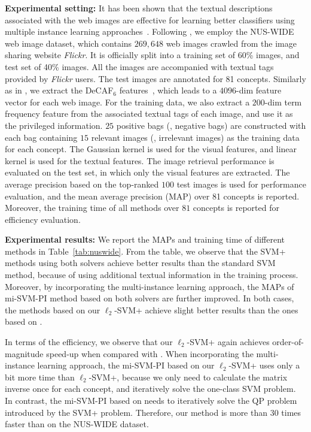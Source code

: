 \noindent\textbf{Experimental setting:} It has been shown that the
textual descriptions associated with the web images are effective for
learning better classifiers using multiple instance learning
approaches~\citep{Li2014ECCV,NiuIJCV2015}.  Following \citep{Li2014ECCV,
  NiuIJCV2015}, we employ the NUS-WIDE web image dataset, which
contains $269, 648$ web images crawled from the image sharing website
\emph{Flickr}. It is officially split into a training set of 60\%
images, and test set of 40\% images. All the images are accompanied
with textual tags provided by \emph{Flickr} users. The test images are
annotated for 81 concepts. Similarly as in \citep{Li2014ECCV}, we
extract the DeCAF$_6$ features~\citep{decaf}, which leads to a
$4096$-dim feature vector for each web image. For the training data,
we also extract a $200$-dim term frequency feature from the associated
textual tags of each image, and use it as the privileged
information. $25$ positive bags (\resp, negative bags) are constructed
with each bag containing $15$ relevant images (\resp, irrelevant
images) as the training data for each concept. The Gaussian kernel is
used for the visual features, and linear kernel is used for the
textual features. The image retrieval performance is evaluated on the
test set, in which only the visual features are extracted. The average
precision based on the top-ranked $100$ test images is used for
performance evaluation, and the mean average precision (MAP) over 81
concepts is reported. Moreover, the training time of all methods over
$81$ concepts is reported for efficiency evaluation.

\noindent\textbf{Experimental results:} We report the MAPs and training time of different methods in Table~\ref{tab:nuswide}. From the table, we observe that the SVM+ methods using both solvers achieve better results than the standard SVM method, because of using additional textual information in the training process. Moreover, by incorporating the multi-instance learning approach, the MAPs of mi-SVM-PI method based on both solvers are further improved. In both cases, the methods based on our $\ell_2$-SVM+ achieve slight better results than the ones based on \matlab.

In terms of the efficiency, we observe that our $\ell_2$-SVM+ again achieves order-of-magnitude speed-up when compared with \matlab. When incorporating the multi-instance learning approach, the mi-SVM-PI based on our $\ell_2$-SVM+ uses only a bit more time than $\ell_2$-SVM+, because we only need to calculate the matrix inverse once for each concept, and iteratively solve the one-class SVM problem. In contrast, the mi-SVM-PI based on \matlab needs to iteratively solve the QP problem introduced by the SVM+ problem. Therefore, our method is more than 30 times faster than \matlab on the NUS-WIDE dataset.

